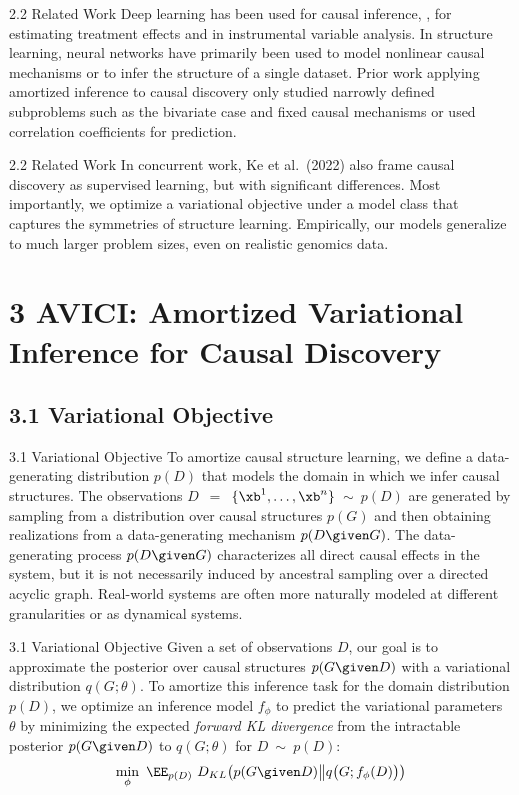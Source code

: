 \documentclass[aspectratio=169,10pt]{beamer}
\begin{document}
\begin{frame}{2.2 Related Work}
Deep learning has been used for causal inference, \eg, for estimating treatment effects and in instrumental variable analysis. In structure learning, neural networks have primarily been used to model nonlinear causal mechanisms or to infer the structure of a single dataset. Prior work applying amortized inference to causal discovery only studied narrowly defined subproblems such as the bivariate case and fixed causal mechanisms or used correlation coefficients for prediction.
\end{frame}

\begin{frame}{2.2 Related Work}
In concurrent work, Ke et al.\ (2022) also frame causal discovery as supervised learning, but with significant differences. Most importantly, we optimize a variational objective under a model class that captures the symmetries of structure learning. Empirically, our models generalize to much larger problem sizes, even on realistic genomics data.
\end{frame}

\section{3 AVICI: Amortized Variational Inference for Causal Discovery}
\subsection{3.1 Variational Objective}

\begin{frame}{3.1 Variational Objective}
To amortize causal structure learning, we define a data-generating distribution $p(D)$ that models the domain in which we infer causal structures. The observations $D$~$=$~$\{\xb^1, \dots, \xb^n \}$~$\sim$~$p(D)$ are generated by sampling from a distribution over causal structures $p(G)$ and then obtaining realizations from a data-generating mechanism $p(D \given G)$. The data-generating process $p(D \given G)$ characterizes all direct causal effects in the system, but it is not necessarily induced by ancestral sampling over a directed acyclic graph. Real-world systems are often more naturally modeled at different granularities or as dynamical systems.
\end{frame}

\begin{frame}{3.1 Variational Objective}
Given a set of observations $D$, our goal is to approximate the posterior over causal structures $p(G \given D)$ with a variational distribution $q(G; \theta)$. To amortize this inference task for the domain distribution $p(D)$, we optimize an inference model $f_\phi$ to predict the variational parameters $\theta$ by minimizing the expected {\em forward KL divergence} from the intractable posterior $p(G \given D)$ to $q(G; \theta)$ for $D$~$\sim$~$p(D)$:
\begin{align*}
	\min_\phi ~\EE_{p(D)}~  D_{KL} \big( p(G \given D) \big\Vert q\big(G ; f_\phi(D)\big )\big)
\end{align*}
\end{frame}
\end{document}
